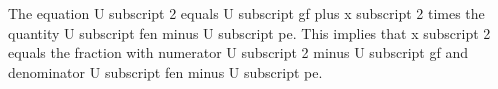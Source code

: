 The equation U subscript 2 equals U subscript gf plus x subscript 2 times the quantity U subscript fen minus U subscript pe. This implies that x subscript 2 equals the fraction with numerator U subscript 2 minus U subscript gf and denominator U subscript fen minus U subscript pe.